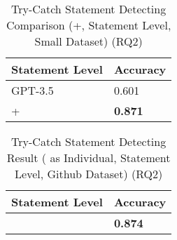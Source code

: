 
\begin{table}[t]%
  \caption{Try-Catch Statement Detecting Comparison ({\xblock}+{\xstate}, Statement Level, Small Dataset) (RQ2)}
  \vspace{-12pt}
  \small
	\begin{center}
		\renewcommand{\arraystretch}{1}
		\begin{tabular}{| p{3.05cm}<{\centering} | p{1.2cm}<{\centering}|}
		  \hline
		Statement Level	  & Accuracy \\
			\hline
                        GPT-3.5 & 0.601  \\
			\hline
			\xblock + \xstate   & \textbf{0.871} \\
			\hline
		\end{tabular}
		\label{tab:xstate-3}
	\end{center}
\end{table}

\begin{table}[t]%
\caption{Try-Catch Statement Detecting Result ({\xstate} as Individual, Statement Level, Github Dataset) (RQ2)}
  \vspace{-12pt}
  \small
	\begin{center}
		\renewcommand{\arraystretch}{1}
		\begin{tabular}{| p{3.05cm}<{\centering} | p{1.2cm}<{\centering}|}
		  \hline
		Statement Level	  & Accuracy\\
			\hline
			\hline
			\xstate  & \textbf{0.874}  \\
			\hline
		\end{tabular}
		\label{tab:xstate-4}
	\end{center}
\end{table}


